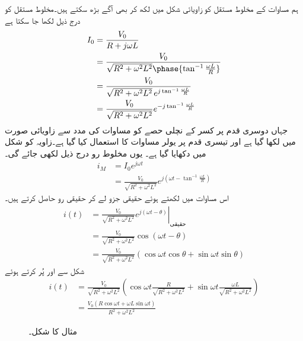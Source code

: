 ہم مساوات  کے مخلوط مستقل  کو زاویائی شکل میں لکھ کر بھی آگے بڑھ سکتے ہیں۔مخلوط مستقل کو درج ذیل لکھا جا سکتا ہے
\begin{align*}
I_0&=\frac{V_0}{R+j\omega L}\\
&=\frac{V_0}{\sqrt{R^2+\omega^2 L^2} \phase{\tan^{-1}\frac{\omega L}{R}}}\\
&=\frac{V_0}{\sqrt{R^2+\omega^2 L^2}\,  e^{j\tan^{-1}\frac{\omega L}{R}}}\\
&=\frac{V_0}{\sqrt{R^2+\omega^2 L^2}} e^{-j\tan^{-1}\frac{\omega L}{R}}
\end{align*}
جہاں دوسری قدم پر کسر کے نچلی حصے کو مساوات  کی مدد سے زاویائی صورت میں لکھا گیا ہے اور تیسری قدم پر یولر مساوات کا استعمال کیا گیا ہے۔زاویہ  کو شکل  میں دکھایا گیا ہے۔ یوں مخلوط رو درج ذیل لکھی جائے گی۔
\begin{align*}
i_M&=I_0 e^{j\omega t}\\
&=\frac{V_0}{\sqrt{R^2+\omega^2 L^2}} e^{j\left(\omega t-\tan^{-1}\frac{\omega L}{R}\right)} 
\end{align*}
اس مساوات میں  لکھتے ہوئے حقیقی جزو لے کر حقیقی رو حاصل کرتے ہیں۔
\begin{align*}
i(t)&=\left. \frac{V_0}{\sqrt{R^2+\omega^2 L^2}} e^{j\left(\omega t-\theta\right)} \right|_{\text{حقیقی}} \\
&=\frac{V_0}{\sqrt{R^2+\omega^2 L^2}} \cos (\omega t-\theta)\\
&=\frac{V_0}{\sqrt{R^2+\omega^2 L^2}} \left(\cos \omega t \cos \theta+\sin \omega t \sin \theta \right)
\end{align*}
شکل  سے   اور
  پُر کرتے ہوئے
\begin{align*}
i(t)&=\frac{V_0}{\sqrt{R^2+\omega^2 L^2}} \left(\cos \omega t \frac{R}{\sqrt{R^2+\omega^2 L^2}}+\sin \omega t \frac{\omega L}{\sqrt{R^2+\omega^2 L^2}}\right)\\
&=\frac{V_0 (R \cos \omega t +\omega L \sin \omega t)}{R^2+\omega^2 L^2}
\end{align*}
%
\begin{figure}
\centering
{}
\caption{مثال  کا شکل۔}
\label{شکل_بدلتا_مخلوط_تفاعل_الف}
\end{figure}

